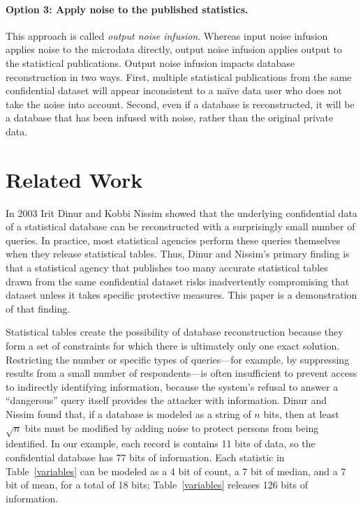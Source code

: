 \documentclass[runningheads]{llncs}
\begin{document}
\paragraph{Option 3: Apply noise to the published statistics.} This
approach is called \emph{output noise infusion}. Whereas input noise infusion
applies noise to the microdata directly, output noise infusion applies
output to the statistical publications.  Output noise infusion impacts
database reconstruction in two ways. First, multiple statistical
publications from the same confidential dataset will appear
inconsistent to a na\"ive data user who does not take the noise into
account. Second, even if a database is reconstructed, it will be a
database that has been infused with noise, rather than the original
private data. 


\section{Related Work}

In 2003 Irit Dinur and Kobbi Nissim\cite{DinurNissim2003} showed that the underlying
confidential data of a statistical database can be reconstructed with
a surprisingly small number of queries. In practice, most statistical
agencies perform these queries themselves when they release
statistical tables. Thus, Dinur and Nissim's primary finding
is that a statistical agency that publishes too many accurate statistical
tables drawn from the same confidential dataset risks inadvertently
compromising that dataset unless it takes specific protective
measures. This paper is a demonstration of that finding.

Statistical tables create the possibility of database reconstruction
because they form a set of constraints for which there is ultimately
only one exact solution. Restricting the number or specific types of
queries---for example, by suppressing results from a small number of
respondents---is often insufficient to prevent access to indirectly
identifying information, because the system's refusal to answer a
``dangerous'' query itself provides the attacker with information.
Dinur and Nissim found that, if a database is modeled as a string of
$n$ bits, then at least $\sqrt{n}$ bits must be modified by adding
noise to protect persons from being identified. In our example, each
record is contains 11 bits of data, so the confidential database has
77 bits of information. Each statistic in Table~\ref{variables}
can be modeled as a 4 bit of count, a 7 bit of median, and a 7 bit of
mean, for a total of 18 bits; Table~\ref{variables} releases 126 bits
of information.
\end{document}

